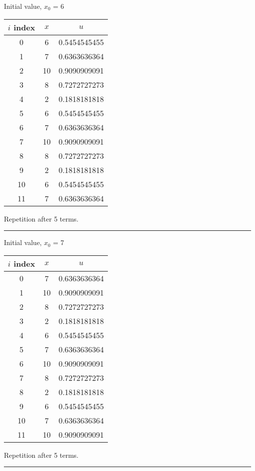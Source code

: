 \documentclass{article}
\begin{document}
Initial value, $x_0$ = 6
\begin{center} \begin{tabular}{||c | c | c||}  \hline
		$i$ index & $x$ & $u$ \\ [0.5ex] \hline \hline0 & 6 & 0.5454545455\\
		\hline 
		1 & 7 & 0.6363636364\\
		\hline 
		2 & 10 & 0.9090909091\\
		\hline 
		3 & 8 & 0.7272727273\\
		\hline 
		4 & 2 & 0.1818181818\\
		\hline 
		5 & 6 & 0.5454545455\\
		\hline 
		6 & 7 & 0.6363636364\\
		\hline 
		7 & 10 & 0.9090909091\\
		\hline 
		8 & 8 & 0.7272727273\\
		\hline 
		9 & 2 & 0.1818181818\\
		\hline 
		10 & 6 & 0.5454545455\\
		\hline 
		11 & 7 & 0.6363636364\\
		\hline 
	\end{tabular} 
\end{center} Repetition after 5 terms.
\\ \noindent\rule[0.5ex]{\linewidth}{1pt}
Initial value, $x_0$ = 7
\begin{center} \begin{tabular}{||c | c | c||}  \hline
		$i$ index & $x$ & $u$ \\ [0.5ex] \hline \hline0 & 7 & 0.6363636364\\
		\hline 
		1 & 10 & 0.9090909091\\
		\hline 
		2 & 8 & 0.7272727273\\
		\hline 
		3 & 2 & 0.1818181818\\
		\hline 
		4 & 6 & 0.5454545455\\
		\hline 
		5 & 7 & 0.6363636364\\
		\hline 
		6 & 10 & 0.9090909091\\
		\hline 
		7 & 8 & 0.7272727273\\
		\hline 
		8 & 2 & 0.1818181818\\
		\hline 
		9 & 6 & 0.5454545455\\
		\hline 
		10 & 7 & 0.6363636364\\
		\hline 
		11 & 10 & 0.9090909091\\
		\hline 
	\end{tabular} 
\end{center} Repetition after 5 terms.
\\ \noindent\rule[0.5ex]{\linewidth}{1pt}
\pagebreak
\end{document}
